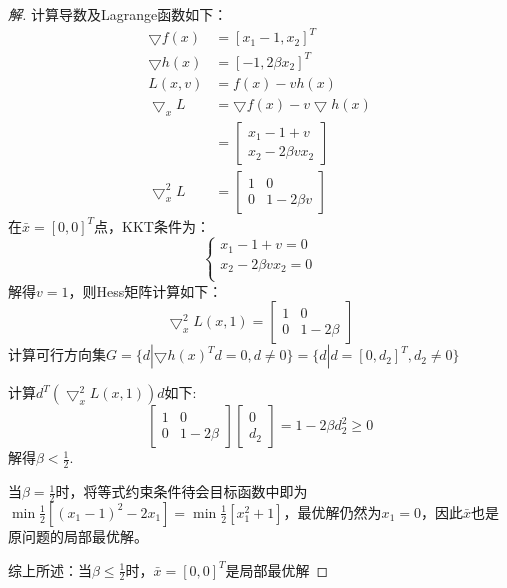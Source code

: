 \documentclass[a4paper]{article}
\begin{document}
\begin{proof}[解]
	计算导数及Lagrange函数如下：
	\begin{equation}
	\begin{aligned}
	\bigtriangledown f(x)&=[x_1-1,x_2]^T \\
	\bigtriangledown h(x)&=[-1,2\beta x_2]^T \\
	L(x,v)&=f(x)-vh(x) \\
	\bigtriangledown_x L&=\bigtriangledown f(x)-v\bigtriangledown h(x) \\
	&=\left[
	\begin{array}{c}
	x_1-1+v \\
	x_2-2\beta vx_2
	\end{array}
	\right]\\
	\bigtriangledown_x^2 L&= \left[
	\begin{array}{cc}
	1 & 0\\
	0 & 1-2\beta v
	\end{array}
	\right]
	\end{aligned}
	\end{equation}
	在$\bar{x}=[0,0]^T$点，KKT条件为：
	\begin{equation}
	\left\{
	\begin{array}{c}
	x_1-1+v=0 \\
	x_2-2\beta vx_2=0 \\
	\end{array}
	\right.
	\end{equation}
	解得$v=1$，则Hess矩阵计算如下：
	\begin{equation}
	\bigtriangledown_x^2 L(x,1)=\left[
	\begin{array}{cc}
	1 & 0\\
	0 & 1-2\beta
	\end{array}\right]
	\end{equation}
	计算可行方向集$G=\{d|\bigtriangledown h(x)^Td=0,d\neq0\}=\{d|d=[0,d_2]^T,d_2\neq0\}$
	
	计算$d^T(\bigtriangledown_x^2 L(x,1) )d$如下:
	\begin{equation}
	[0,d_2]\left[
	\begin{array}{cc}
	1 & 0\\
	0 & 1-2\beta
	\end{array}
	\right]\left[
	\begin{array}{c}
	0 \\
	d_2
	\end{array}
	\right]=1-2\beta d_2^2\ge 0
	\end{equation}
	解得$\beta < \frac{1}{2}$.
	
	当$\beta=\frac{1}{2}$时，将等式约束条件待会目标函数中即为$\min \frac{1}{2}[(x_1-1)^2-2x_1]=\min \frac{1}{2}[x_1^2+1]$，最优解仍然为$x_1=0$，因此$\bar{x}$也是原问题的局部最优解。
	
	综上所述：当$\beta \le \frac{1}{2}$时，$\bar{x}=[0,0]^T$是局部最优解
\end{proof}
\end{document}

